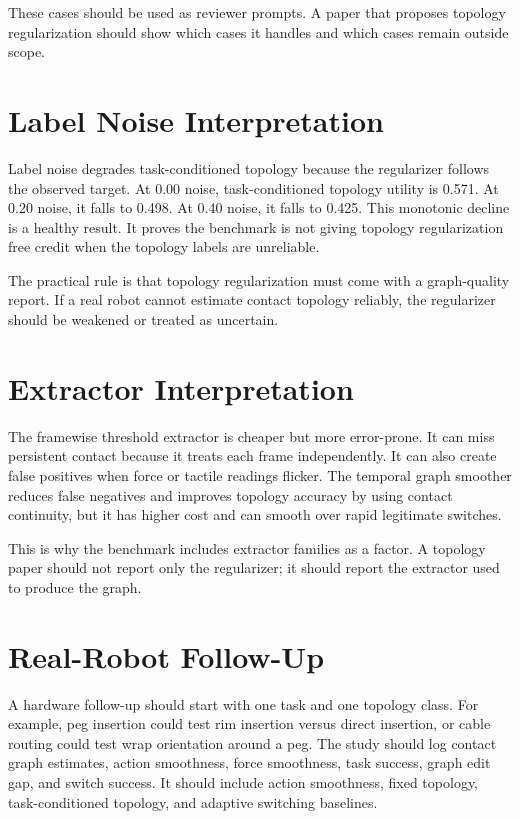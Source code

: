 \documentclass{article}
\begin{document}
These cases should be used as reviewer prompts. A paper that proposes topology regularization should show which cases it handles and which cases remain outside scope.

\section{Label Noise Interpretation}

Label noise degrades task-conditioned topology because the regularizer follows the observed target. At 0.00 noise, task-conditioned topology utility is 0.571. At 0.20 noise, it falls to 0.498. At 0.40 noise, it falls to 0.425. This monotonic decline is a healthy result. It proves the benchmark is not giving topology regularization free credit when the topology labels are unreliable.

The practical rule is that topology regularization must come with a graph-quality report. If a real robot cannot estimate contact topology reliably, the regularizer should be weakened or treated as uncertain.

\section{Extractor Interpretation}

The framewise threshold extractor is cheaper but more error-prone. It can miss persistent contact because it treats each frame independently. It can also create false positives when force or tactile readings flicker. The temporal graph smoother reduces false negatives and improves topology accuracy by using contact continuity, but it has higher cost and can smooth over rapid legitimate switches.

This is why the benchmark includes extractor families as a factor. A topology paper should not report only the regularizer; it should report the extractor used to produce the graph.

\section{Real-Robot Follow-Up}

A hardware follow-up should start with one task and one topology class. For example, peg insertion could test rim insertion versus direct insertion, or cable routing could test wrap orientation around a peg. The study should log contact graph estimates, action smoothness, force smoothness, task success, graph edit gap, and switch success. It should include action smoothness, fixed topology, task-conditioned topology, and adaptive switching baselines.
\end{document}
